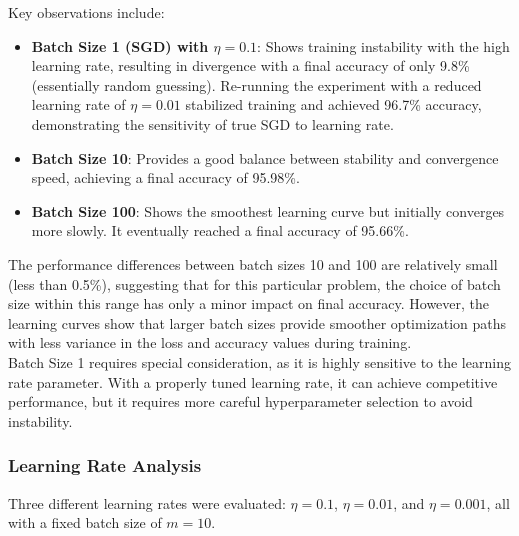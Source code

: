 \documentclass{article}
\begin{document}

\pagebreak

Key observations include:
\begin{itemize}
    \item \textbf{Batch Size 1 (SGD) with $\eta=0.1$}: Shows training instability with the high learning rate, 
    resulting in divergence with a final accuracy of only 9.8\% (essentially random guessing). 
    Re-running the experiment with a reduced learning rate of $\eta=0.01$ stabilized training and 
    achieved 96.7\% accuracy, demonstrating the sensitivity of true SGD to learning rate.
    \item \textbf{Batch Size 10}: Provides a good balance between stability and convergence speed, 
    achieving a final accuracy of 95.98\%.
    \item \textbf{Batch Size 100}: Shows the smoothest learning curve but initially converges more slowly. It eventually reached a final accuracy of 95.66\%.
\end{itemize}

\noindent The performance differences between batch sizes 10 and 100 
are relatively small (less than 0.5\%), suggesting that for this particular problem, the choice of batch 
size within this range has only a minor impact on final accuracy. However, the learning curves show 
that larger batch sizes provide smoother optimization paths with less variance in the loss and accuracy 
values during training. \\

\noindent Batch Size 1 requires special consideration, as it is highly sensitive to the learning rate 
parameter. With a properly tuned learning rate, it can achieve competitive performance, but it 
requires more careful hyperparameter selection to avoid instability.

\subsubsection{Learning Rate Analysis}
Three different learning rates were evaluated: $\eta=0.1$, $\eta=0.01$, and $\eta=0.001$, all with a fixed batch size of $m=10$.
\end{document}
